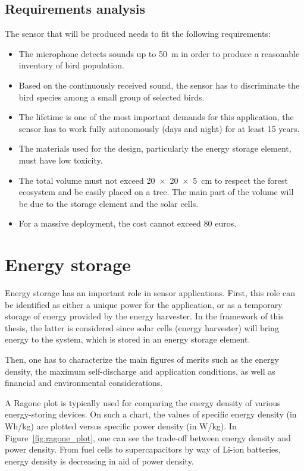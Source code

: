 \documentclass{EPL-master-thesis-covers-EN}
\begin{document}
\section{Requirements analysis}
\label{section:requirements}

The sensor that will be produced needs to fit the following requirements:

\begin{itemize}
 \item The microphone detects sounds up to \SI{50}{m} in order to produce a reasonable inventory of bird population. 
 \item Based on the continuously received sound, the sensor has to discriminate the bird species among a small group of selected birds.
 \item The lifetime is one of the most important demands for this application, the sensor has to work fully autonomously (days and night) for at least 15 years.
 \item The materials used for the design, particularly the energy storage element, must have low toxicity.
 \item The total volume must not exceed \SI{20 x 20 x 5}{cm} to respect the forest ecosystem and be easily placed on a tree. The main part of the volume will be due to the storage element and the solar cells.
 \item For a massive deployment, the cost cannot exceed 80 euros.
\end{itemize}



\chapter{Energy storage}

Energy storage has an important role in sensor applications. First, this role can be identified as either a unique power for the application, or as a temporary storage of energy provided by the energy harvester. In the framework of this thesis, the latter is considered since solar cells (energy harvester) will bring energy to the system, which is stored in an energy storage element.

Then, one has to characterize the main figures of merits such as the energy density, the maximum self-discharge and application conditions, as well as financial and environmental considerations.

A Ragone plot is typically used for comparing the energy density of various energy-storing devices. On such a chart, the values of specific energy density (in \si{Wh/kg}) are plotted versus specific power density (in \si{W/kg}). In Figure~\ref{fig:ragone_plot}, one can see the trade-off between energy density and power density. From fuel cells to supercapacitors by way of Li-ion batteries, energy density is decreasing in aid of power density.
\end{document}
